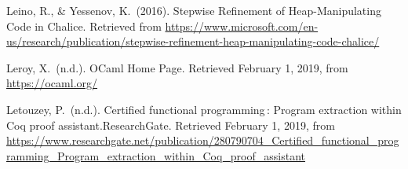 \documentclass[12pt,twoside]{article}
\begin{document}
{\begin{thebibliography}{222}
Leino, R., \& Yessenov, K.~(2016). Stepwise Refinement of Heap-Manipulating Code in Chalice. Retrieved from \href{https://www.microsoft.com/en-us/research/publication/stepwise-refinement-heap-manipulating-code-chalice/}{{\ttfamily https://\hspace{0pt}www.\hspace{0pt}microsoft.\hspace{0pt}com/\hspace{0pt}en-\hspace{0pt}us/\hspace{0pt}research/\hspace{0pt}publication/\hspace{0pt}stepwise-\hspace{0pt}refinement-\hspace{0pt}heap-\hspace{0pt}manipulating-\hspace{0pt}code-\hspace{0pt}chalice/\hspace{0pt}}}\label{leino_stepwise_2016}%

\mdbibitemlabel{[Leroy, n.d.]}Leroy, X.~(n.d.). OCaml Home Page. Retrieved February 1, 2019, from \href{https://ocaml.org/}{{\ttfamily https://\hspace{0pt}ocaml.\hspace{0pt}org/\hspace{0pt}}}\label{leroy_ocaml_nodate}%

\mdbibitemlabel{[Letouzey, n.d.]}Letouzey, P.~(n.d.). Certified functional programming : Program extraction within Coq proof assistant.ResearchGate. Retrieved February 1, 2019, from \href{https://www.researchgate.net/publication/280790704_Certified_functional_programming_Program_extraction_within_Coq_proof_assistant}{{\ttfamily https://\hspace{0pt}www.\hspace{0pt}researchgate.\hspace{0pt}net/\hspace{0pt}publication/\hspace{0pt}280790704\_\hspace{0pt}Certified\_\hspace{0pt}functional\_\hspace{0pt}programming\_\hspace{0pt}Program\_\hspace{0pt}extraction\_\hspace{0pt}within\_\hspace{0pt}Coq\_\hspace{0pt}proof\_\hspace{0pt}assistant}}\label{letouzey_certified_nodate}%


\end{thebibliography}}
\end{document}
